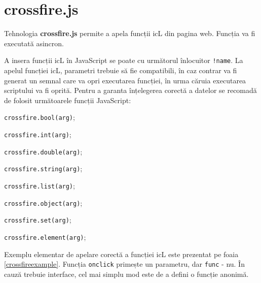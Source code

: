 \section{crossfire.js}

Tehnologia {\bf crossfire.js} permite a apela funcții icL din pagina web. Funcția va fi executată asincron.

A insera funcții icL în JavaScript se poate cu următorul înlocuitor \texttt{!{name}}. La apelul funcției icL, parametri trebuie să fie compatibili, în caz contrar va fi generat un semnal care va opri executarea funcției, în urma căruia executarea scriptului va fi oprită. Pentru a garanta înțelegerea corectă a datelor se recomadă de folosit următoarele funcții JavaScript:
\begin{icItems}
	\item \texttt{crossfire.bool(arg)};
	\item \texttt{crossfire.int(arg)};
	\item \texttt{crossfire.double(arg)};
	\item \texttt{crossfire.string(arg)};
	\item \texttt{crossfire.list(arg)};
	\item \texttt{crossfire.object(arg)};
	\item \texttt{crossfire.set(arg)};
	\item \texttt{crossfire.element(arg)};
\end{icItems}

Exemplu elementar de apelare corectă a funcției icL este prezentat pe foaia \ref{crossfireexample}. Funcția \texttt{onclick} primește un parametru, dar \texttt{func} - nu. În cauză trebuie interface, cel mai simplu mod este de a defini o funcție anonimă.

\begin{sourcecode}
\label{crossfireexample}
\inputminted[linenos]{icl}{../sources/crossfireexample.icL}
\end{sourcecode}

